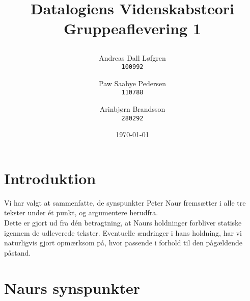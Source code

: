 \documentclass[11pt,a4paper,oneside,final]{article}
\title{ %
    \vspace{2in}
    \LARGE{Datalogiens Videnskabsteori}\\
    \huge{Gruppeaflevering 1}
    \author{ %
        \begin{minipage}{0.30\textwidth}
            \centering
            Andreas Dall Løfgren\\
            \texttt{100992}
        \end{minipage}
        \vspace{5pt}
        \and
        \begin{minipage}{0.30\textwidth}
            \centering
            Paw Saabye Pedersen\\
            \texttt{110788}
        \end{minipage}
        \vspace{5pt}
        \and
        \begin{minipage}{0.35\textwidth}
            \centering
            Arinbjørn Brandsson\\
            \texttt{280292}
        \end{minipage}
    }
    \setcounter{page}{0}
    \date{\today}
}
\begin{document}
\maketitle
\thispagestyle{empty}
\newpage

\thispagestyle{psty:toc}
\tableofcontents
\newpage

\section{Introduktion}
Vi har valgt at sammenfatte, de synspunkter Peter Naur fremsætter i alle tre
tekster under ét punkt, og argumentere herudfra.\\
Dette er gjort ud fra dén betragtning, at Naurs holdninger forbliver statiske
igennem de udleverede tekster. Eventuelle ændringer i hans holdning, har vi
naturligvis gjort opmærksom på, hvor passende i forhold til den pågældende
påstand.

\section{Naurs synspunkter}
\end{document}
